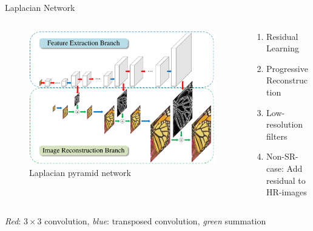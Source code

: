 \documentclass{beamer}
\begin{document}
\begin{frame}{Laplacian Network}
\begin{columns}
\begin{column}{0.66\textwidth}
  \begin{figure}[h]
    \centering
    \includegraphics[width=1.0\textwidth]{lap_srn.png}
    \caption*{Laplacian pyramid network}
    \label{fig:lap-srn}
  \end{figure}
\end{column}

\begin{column}{0.34\textwidth}
  \begin{enumerate}
  \item Residual Learning
  \item Progressive Reconstruction
  \item Low-resolution filters
  \item Non-SR-case: Add residual to HR-images
  \end{enumerate}
\end{column}
\end{columns}
\textit{Red}: $3 \times 3$ convolution, \textit{blue}: transposed convolution, \textit{green} summation
\end{frame}
\end{document}
